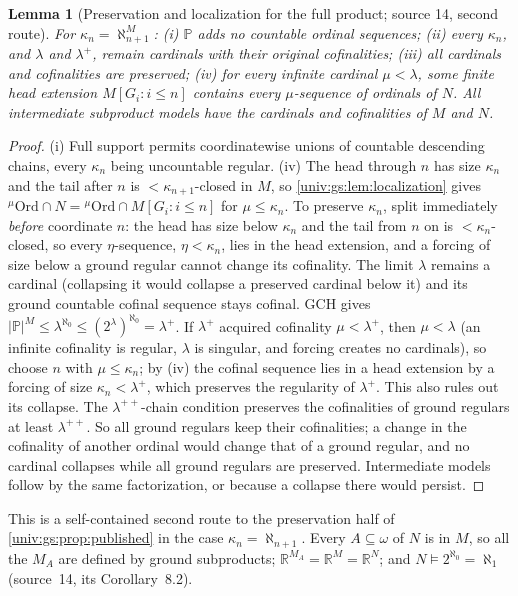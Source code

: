 \documentclass[11pt,letterpaper]{article}
\numberwithin{equation}{section}
\newtheorem{lemma}[lemma]{Lemma}
\theoremstyle{definition}
\theoremstyle{remark}
\newcommand{\Ord}{\mathrm{Ord}}
\newcommand{\R}{\mathbb R}
\newcommand{\abs}[1]{\lvert#1\rvert}
\begin{document}
\begin{lemma}[Preservation and localization for the full product; source 14, second route]\label{univ:gs:lem:preservation}
For $\kappa_n=\aleph_{n+1}^M$: (i) $\mathbb P$ adds no countable ordinal sequences; (ii) every
$\kappa_n$, and $\lambda$ and $\lambda^+$, remain cardinals with their original
cofinalities; (iii) all cardinals and cofinalities are preserved; (iv) for every
infinite cardinal $\mu<\lambda$, some finite head extension $M[G_i:i\le n]$ contains every
$\mu$-sequence of ordinals of $N$. All intermediate subproduct models have the cardinals
and cofinalities of $M$ and $N$.
\end{lemma}
\begin{proof}
(i) Full support permits coordinatewise unions of countable descending chains, every
$\kappa_n$ being uncountable regular. (iv) The head through $n$ has size $\kappa_n$ and
the tail after $n$ is $<\kappa_{n+1}$-closed in $M$, so \cref{univ:gs:lem:localization}
gives ${}^\mu\Ord\cap N={}^\mu\Ord\cap M[G_i:i\le n]$ for $\mu\le\kappa_n$. To preserve
$\kappa_n$, split immediately \emph{before} coordinate $n$: the head has size below
$\kappa_n$ and the tail from $n$ on is $<\kappa_n$-closed, so every $\eta$-sequence,
$\eta<\kappa_n$, lies in the head extension, and a forcing of size below a ground regular
cannot change its cofinality. The limit $\lambda$ remains a cardinal (collapsing it
would collapse a preserved cardinal below it) and its ground countable cofinal sequence
stays cofinal. GCH gives $\abs{\mathbb P}^M\le\lambda^{\aleph_0}\le(2^\lambda)^{\aleph_0}
=\lambda^+$. If $\lambda^+$ acquired cofinality $\mu<\lambda^+$, then $\mu<\lambda$ (an
infinite cofinality is regular, $\lambda$ is singular, and forcing creates no cardinals),
so choose $n$ with $\mu\le\kappa_n$; by (iv) the cofinal sequence lies in a head extension
by a forcing of size $\kappa_n<\lambda^+$, which preserves the regularity of $\lambda^+$.
This also rules out its collapse. The $\lambda^{++}$-chain condition preserves the
cofinalities of ground regulars at least $\lambda^{++}$. So all ground regulars keep their
cofinalities; a change in the cofinality of another ordinal would change that of a ground
regular, and no cardinal collapses while all ground regulars are preserved. Intermediate
models follow by the same factorization, or because a collapse there would persist.
\end{proof}

This is a self-contained second route to the preservation half of
\cref{univ:gs:prop:published} in the case $\kappa_n=\aleph_{n+1}$. Every $A\subseteq\omega$
of $N$ is in $M$, so all the $M_A$ are defined by ground subproducts;
$\R^{M_A}=\R^M=\R^N$; and $N\models2^{\aleph_0}=\aleph_1$ (source~14, its
Corollary~8.2).
\end{document}
